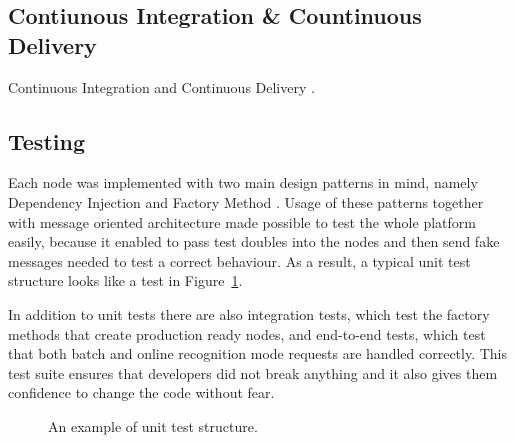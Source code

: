 \subsection{Contiunous Integration \& Countinuous Delivery}
Continuous Integration \cite{fowler2006continuous} and Continuous Delivery \cite{humble2010continuous}.


\BLIND

\subsection{Testing}
Each node was implemented with two main design patterns in mind, namely Dependency Injection \cite{fowler2004inversion} and Factory Method \cite{gamma1993design}.
Usage of these patterns together with message oriented architecture made possible to test the whole platform easily,
  because it enabled to pass test doubles into the nodes
  and then send fake messages needed to test a correct behaviour.
As a result, a typical unit test structure looks like a test in Figure~\ref{fig:unit-test}.

In addition to unit tests there are also integration tests,
  which test the factory methods that create production ready nodes,
  and end-to-end tests,
  which test that both batch and online recognition mode requests are handled correctly.
This test suite ensures that developers did not break anything
  and it also gives them confidence to change the code without fear.

\begin{figure}[h]
  

  \caption{An example of unit test structure.}
  \label{fig:unit-test}
\end{figure}


